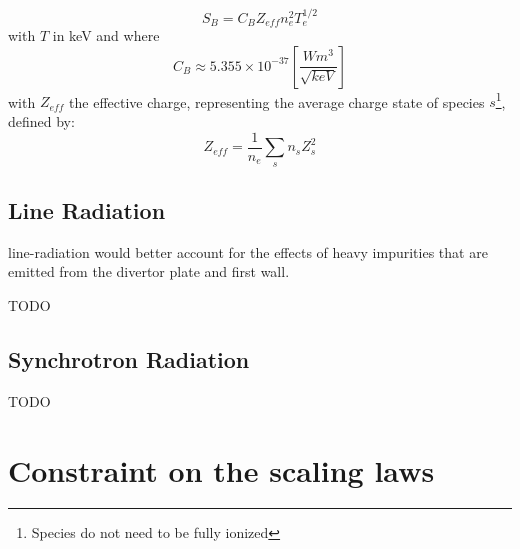 \begin{equation}
	S_B
	=
	C_B Z_{eff} n_e^2 T_e^{1/2}
\end{equation}
with $T$ in keV and where 
\begin{equation*}
	C_B 
\approx
5.355 \times 10^{-37} \left[ \frac{W m^3}{ \sqrt{keV}} \right]
\end{equation*}
with $Z_{eff}$ the effective charge, representing the average
charge state of species
$s$\footnote{Species do not need to be fully ionized}, defined by:
\begin{equation}
	Z_{eff}
	=
	\frac{1}{n_e}
	\sum_s
	n_s Z_s^2
	\label{eq:effective_charge}
\end{equation}



\subsection{Line Radiation}
line-radiation would better account for the effects of heavy impurities that are emitted from the divertor plate and first wall.

TODO

\subsection{Synchrotron Radiation}

TODO


\section{Constraint on the scaling laws}
\label{appendix:scaling_law_dimensionless}

